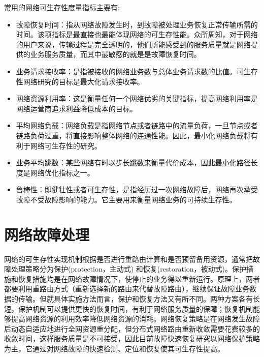 常用的网络可生存性度量指标主要有:
\begin{itemize}
  \item 故障恢复时间：指从网络故障发生时，到故障被处理业务恢复正常传输所需的时间。该项指标是最直接也最能体现网络的可生存性能。众所周知，对于网络的用户来说，传输过程是完全透明的，他们所能感受到的服务质量就是网络提供的业务服务质量，而其中最敏感的就是是故障恢复时间。
  \item 业务请求接收率：是指被接收的网络业务数与总体业务请求数的比值。可生存性网络研究的目标是最大化请求接收率。
  \item 网络资源利用率：这是衡量任何一个网络优劣的关键指标，提高网络利用率是网络运营商追求利益降低成本的目标。
  \item 平均网络负载：网络负载是指网络节点或者链路中的流量负荷，一旦节点或者链路负荷过重，将直接影响整体网络的连通性能。因此，最小化网络负载将有利于网络可生存性的研究。
  \item 业务平均跳数：某些网络有时以步长跳数来衡量代价成本，因此最小化路径长度是网络优化指标之一。
  \item 鲁棒性：即健壮性或者可生存性，是指经历过一次网络故障后，网络再次承受故障不受故障影响的能力。它主要用来衡量网络业务的可持续生存性。
\end{itemize}



\section{网络故障处理}


网络的可生存性实现机制根据是否进行重路由计算和是否预留备用资源，通常把故障处理策略分为保护(protection，主动式) 和恢复(restoration，被动式)\cite{hanjianjun2007,kvalbein2009multiple}。保护措施和恢复措施均是在网络故障情况下，使停止的业务得以重新运行。原理上，两者都要利用重路由方式（重新选择新的路由来代替故障路由），继续保证故障业务数据的传输。但就具体实施方法而言，保护和恢复方法又有所不同。两种方案各有长短，保护机制可以提供更快的恢复时间，有利于网络服务质量的保障；恢复机制能够提高网络资源的利用效率降低网络资源的消耗。网络恢复策略是在网络发生故障后动态自适应地进行全网资源重分配，但分布式网络路由重新收敛需要花费较多的收敛时间，这样服务质量是不可接受，因此目前故障快速恢复研究以网络保护策略为主，它通过对网络故障的快速检测、定位和恢复使其可生存性提高。



